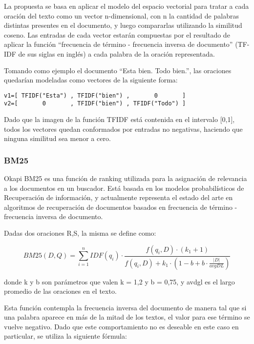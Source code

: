 \documentclass{llncs}
\begin{document}
La propuesta se basa en aplicar el modelo del espacio vectorial para tratar a cada oración del texto como un vector n-dimensional, con n la cantidad de palabras distintas presentes en el documento, y luego compararlas utilizando la similitud coseno. Las entradas de cada vector estarán compuestas por el resultado de aplicar la función “frecuencia de término - frecuencia inversa de documento” (TF-IDF de sus siglas en inglés) a cada palabra de la oración representada.

Tomando como ejemplo el documento “Esta bien. Todo bien.”, las oraciones quedarían modeladas como vectores de la siguiente forma:

\begin{Verbatim}[xleftmargin=3em]
v1=[ TFIDF("Esta") , TFIDF("bien") ,       0       ]
v2=[       0       , TFIDF("bien") , TFIDF("Todo") ]
\end{Verbatim}

Dado que la imagen de la función TFIDF está contenida en el intervalo [0,1], todos los vectores quedan conformados por entradas no negativas, haciendo que ninguna similitud sea menor a cero. 


\subsubsection{BM25}
Okapi BM25 es una función de ranking utilizada para la asignación de relevancia a los documentos en un buscador. Está basada en los modelos probabilísticos de Recuperación de información, y actualmente representa el estado del arte en algoritmos de recuperación de documentos basados en frecuencia de término - frecuencia inversa de documento.

Dadas dos oraciones R,S, la misma se define como:

\begin{equation}
BM25(D,Q) = \sum_{i=1}^{n} IDF(q_i) \cdot \frac{f(q_i, D) \cdot (k_1 + 1)}{f(q_i, D) + k_1 \cdot (1 - b + b \cdot \frac{|D|}{avgDL})}
\end{equation}

donde k y b son parámetros que valen k = 1,2 y b = 0,75, y avdgl es el largo promedio de las oraciones en el texto.

Esta función contempla la frecuencia inversa del documento de manera tal que si una palabra aparece en más de la mitad de los textos, el valor para ese término se vuelve negativo. Dado que este comportamiento no es deseable en este caso en particular, se utiliza la siguiente fórmula:
                
\end{document}
